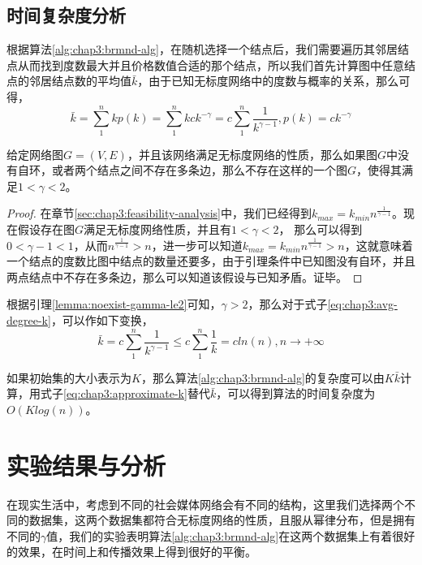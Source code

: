 \subsection{时间复杂度分析}
根据算法\ref{alg:chap3:brmnd-alg}，在随机选择一个结点后，我们需要遍历其邻居结点从而找到度数最大并且价格数值合适的那个结点，所以我们首先计算图中任意结点的邻居结点数的平均值$\bar{k}$，由于已知无标度网络中的度数与概率的关系，那么可得，
\begin{equation}
\label{eq:chap3:avg-degree-k}
\bar{k} = \sum_{1}^{n} kp(k) = \sum_{1}^{n}kck^{-\gamma} = c\sum_{1}^{n}\frac{1}{k^{\gamma-1}},p(k)=ck^{-\gamma}
\end{equation}


\begin{lemma}
\label{lemma:noexist-gamma-le2}
给定网络图$G=(V, E)$，并且该网络满足无标度网络的性质，那么如果图$G$中没有自环，或者两个结点之间不存在多条边，那么不存在这样的一个图$G$，使得其满足$1 < \gamma < 2$。
\end{lemma}
\begin{proof}
在章节\ref{sec:chap3:feasibility-analysis}中，我们已经得到$k_{max} = k_{min}n^{\frac{1}{\gamma-1}}$。现在假设存在图$G$满足无标度网络性质，并且有$1 < \gamma < 2$， 那么可以得到$0 < \gamma-1 < 1$，从而$n^{\frac{1}{\gamma-1}} > n$，进一步可以知道$k_{max} = k_{min}n^{\frac{1}{\gamma-1}} > n$，这就意味着一个结点的度数比图中结点的数量还要多，由于引理条件中已知图没有自环，并且两点结点中不存在多条边，那么可以知道该假设与已知矛盾。证毕。
\end{proof}


根据引理\ref{lemma:noexist-gamma-le2}可知，$\gamma > 2$，那么对于式子\ref{eq:chap3:avg-degree-k}，可以作如下变换，
\begin{equation}
\label{eq:chap3:approximate-k}
\bar{k} = c\sum_{1}^{n}\frac{1}{k^{\gamma-1}} \leq c\sum_{1}^{n}\frac{1}{k}=cln(n),n \rightarrow +\infty
\end{equation}


如果初始集的大小表示为$K$，那么算法\ref{alg:chap3:brmnd-alg}的复杂度可以由$K\bar{k}$计算，用式子\ref{eq:chap3:approximate-k}替代$\bar{k}$，可以得到算法的时间复杂度为$O(Klog(n))$。


\section{实验结果与分析}
在现实生活中，考虑到不同的社会媒体网络会有不同的结构，这里我们选择两个不同的数据集，这两个数据集都符合无标度网络的性质，且服从幂律分布，但是拥有不同的$\gamma$值，我们的实验表明算法\ref{alg:chap3:brmnd-alg}在这两个数据集上有着很好的效果，在时间上和传播效果上得到很好的平衡。

